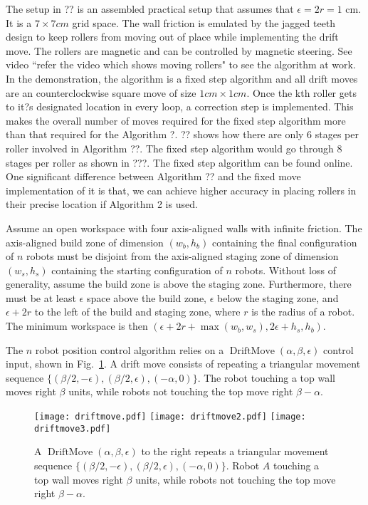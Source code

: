 The setup in ?? is an assembled practical setup that assumes that $\epsilon=2r = 1$ cm. It is a $7\times 7cm$ grid space. The wall friction is emulated by the jagged teeth design to keep rollers from moving out of place while implementing the drift move. The rollers are magnetic and can be controlled by magnetic steering. See video ``refer the video which shows moving rollers"  to see the algorithm at work. In the demonstration, the algorithm is a fixed step algorithm and all drift moves are an counterclockwise square move  of size $1cm\times1cm$. Once the kth roller gets to it?s designated location in every loop, a correction step is implemented. This makes the overall number of moves required for the fixed step algorithm more than that required for the Algorithm ?. ?? shows how there are only 6 stages per roller involved in Algorithm ??. The fixed step algorithm would go through 8 stages per roller as shown in ???. The fixed step algorithm can be found online. One significant difference between Algorithm ?? and the fixed move implementation of it is that, we can achieve higher accuracy in placing rollers in their precise location if Algorithm 2 is used. 


Assume an open workspace with four axis-aligned walls with infinite friction.
The axis-aligned build zone of dimension $(w_b, h_b)$ containing the final configuration of $n$ robots must be disjoint from the axis-aligned staging zone of dimension $(w_s, h_s)$  containing the starting configuration of $n$ robots. Without loss of generality, assume the build zone  is above the staging zone. 
Furthermore, there must be at least $\epsilon$ space above the build zone, $\epsilon$ below the staging zone, and $\epsilon + 2r$ to the left of the build and staging zone, where $r$ is the radius of a robot.  The minimum workspace is then $(\epsilon + 2r + \max(w_b,w_s), 2\epsilon + h_s,h_b)$.

The $n$ robot position control algorithm relies on a $\operatorname{DriftMove}(\alpha, \beta, \epsilon)$ control input, shown in Fig.\  \ref{fig:driftmove}.
A drift move consists of repeating a triangular movement sequence $\{ (\beta/2,-\epsilon),(\beta/2,\epsilon),(-\alpha,0)\}$. The robot touching a top wall moves right $\beta$ units, while robots not touching the top move right $\beta-\alpha$.

\begin{figure}
\begin{center}
	\texttt{[image: driftmove.pdf]}
	\texttt{[image: driftmove2.pdf]}
	\texttt{[image: driftmove3.pdf]}
\end{center}
\vspace{-1em}
\caption{\label{fig:driftmove}
A  $\operatorname{DriftMove}(\alpha, \beta, \epsilon)$ to the right repeats a triangular movement sequence $\{ (\beta/2,-\epsilon),(\beta/2,\epsilon),(-\alpha,0)\}$. Robot $A$ touching a top wall moves right $\beta$ units, while robots not touching the top move right $\beta-\alpha$.}
\vspace{-1em}
\end{figure}

